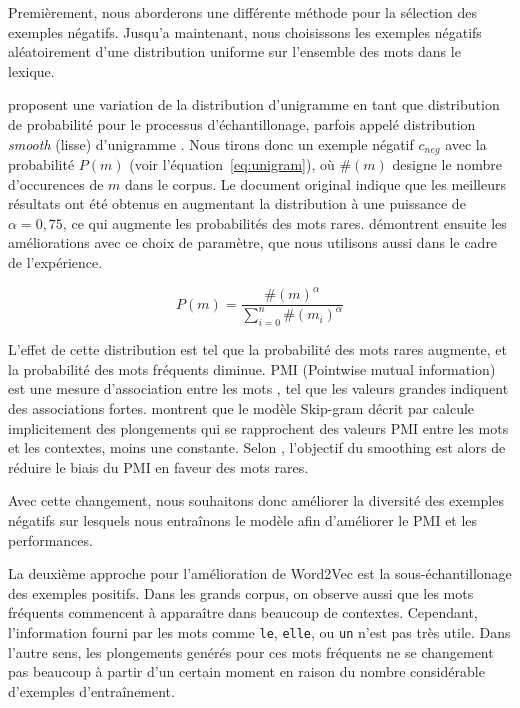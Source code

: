 \documentclass[12pt]{article}
\begin{document}
Premièrement, nous aborderons une différente méthode pour la sélection des exemples négatifs. Jusqu'a maintenant, nous choisissons les exemples négatifs aléatoirement d'une distribution uniforme sur l'ensemble des mots dans le lexique. 

\cite{DBLP:conf/nips/MikolovSCCD13} proposent une variation de la distribution d'unigramme en tant que distribution de probabilité pour le processus d'échantillonage, parfois appelé distribution \textit{smooth} (lisse) d'unigramme \citep{levy2015improving}. Nous tirons donc un exemple négatif $c_{neg}$ avec la probabilité $P(m)$ (voir l'équation~\ref{eq:unigram}), où $\#(m)$ designe le nombre d'occurences de $m$ dans le corpus. Le document original indique que les meilleurs résultats ont été obtenus en augmentant la distribution à une puissance de $\alpha = 0{,}75$, ce qui augmente les probabilités des mots rares. \cite{levy2015improving} démontrent ensuite les améliorations avec ce choix de paramètre, que nous utilisons aussi dans le cadre de l'expérience.

\begin{equation}\label{eq:unigram}
P(m) = \frac{\#(m)^{\alpha}}{\sum_{i=0}^n \#(m_i)^{\alpha}}
\end{equation}

L'effet de cette distribution est tel que la probabilité des mots rares augmente, et la probabilité des mots fréquents diminue. PMI (Pointwise mutual information) est une mesure d'association entre les mots \citep{jurafsky2000speech}, tel que les valeurs grandes indiquent des associations fortes. \cite{levy2014neural} montrent que le modèle Skip-gram décrit par \cite{DBLP:conf/nips/MikolovSCCD13} calcule implicitement des plongements qui se rapprochent des valeurs PMI entre les mots et les contextes, moins une constante. Selon \cite{levy2015improving}, l'objectif du smoothing est alors de réduire le biais du PMI en faveur des mots rares. 

Avec cette changement, nous souhaitons donc améliorer la diversité des exemples négatifs sur lesquels nous entraînons le modèle afin d'améliorer le PMI et les performances.

La deuxième approche pour l'amélioration de Word2Vec est la sous-échantillonage des exemples positifs. Dans les grands corpus, on observe aussi que les mots fréquents commencent à apparaître dans beaucoup de contextes. Cependant, l'information fourni par les mots comme \texttt{le}, \texttt{elle}, ou \texttt{un} n'est pas très utile. Dans l'autre sens, les plongements genérés pour ces mots fréquents ne se changement pas beaucoup à partir d'un certain moment en raison du nombre considérable d'exemples d'entraînement. 
\end{document}
